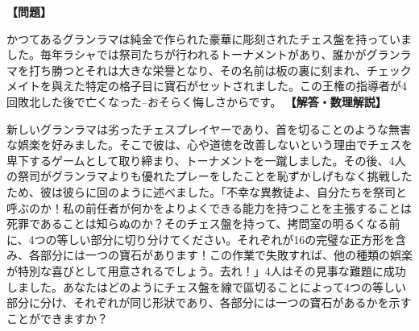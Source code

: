 \documentclass[10pt,a4paper,oneside,openany]{ltjsbook}
\begin{document}
\begin{tcolorbox}[colback=softblue,colframe=primaryblue,title=\textbf{第 291 問：グランラマの問題 （原題: THE GRAND LAMA'S PROBLEM.）},arc=2mm,boxrule=1pt,breakable]
\textbf{【問題】}\par\vspace{0.3em}
かつてあるグランラマは純金で作られた豪華に彫刻されたチェス盤を持っていました。毎年ラシャでは祭司たちが行われるトーナメントがあり、誰かがグランラマを打ち勝つとそれは大きな栄譽となり、その名前は板の裏に刻まれ、チェックメイトを與えた特定の格子目に寶石がセットされました。この王権の指導者が4回敗北した後で亡くなった--おそらく悔しさからです。
\tcblower
\textbf{【解答・数理解説】}\par\vspace{0.3em}
新しいグランラマは劣ったチェスプレイヤーであり、首を切ることのような無害な娯楽を好みました。そこで彼は、心や道徳を改善しないという理由でチェスを卑下するゲームとして取り締まり、トーナメントを一蹴しました。その後、4人の祭司がグランラマよりも優れたプレーをしたことを恥ずかしげもなく挑戦したため、彼は彼らに回のように述べました。「不幸な異教徒よ、自分たちを祭司と呼ぶのか！私の前任者が何かをよりよくできる能力を持つことを主張することは死罪であることは知らぬのか？そのチェス盤を持って、拷問室の明るくなる前に、4つの等しい部分に切り分けてください。それぞれが16の完璧な正方形を含み、各部分には一つの寶石があります！この作業で失敗すれば、他の種類の娯楽が特別な喜びとして用意されるでしょう。去れ！」4人はその見事な難題に成功しました。あなたはどのようにチェス盤を線で區切ることによって4つの等しい部分に分け、それぞれが同じ形狀であり、各部分には一つの寶石があるかを示すことができますか？
\end{tcolorbox}
\end{document}

